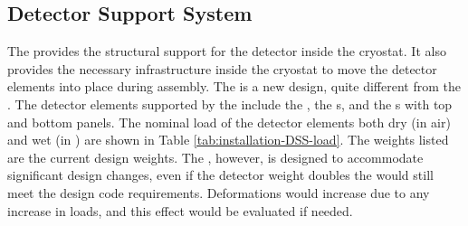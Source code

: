 \subsection{Detector Support System}
\label{sec:fdsp-tc-infr-dss}


The  provides the structural support for the detector inside the cryostat.  
It also provides the necessary infrastructure inside the cryostat to move the detector elements into place during assembly. 
The  is a new design, quite different from the  . The detector elements supported by the  include the , the s, and the s with top and bottom  panels. 
The nominal load of the detector elements both dry (in air) and wet (in ) are shown in Table \ref{tab:installation-DSS-load}. 
The weights listed are the current design weights.  
The , however, is designed to accommodate significant design changes, even if the detector weight  doubles the  would still meet the design code requirements.  
Deformations would increase due to any increase in loads, and this effect would be evaluated if needed.

